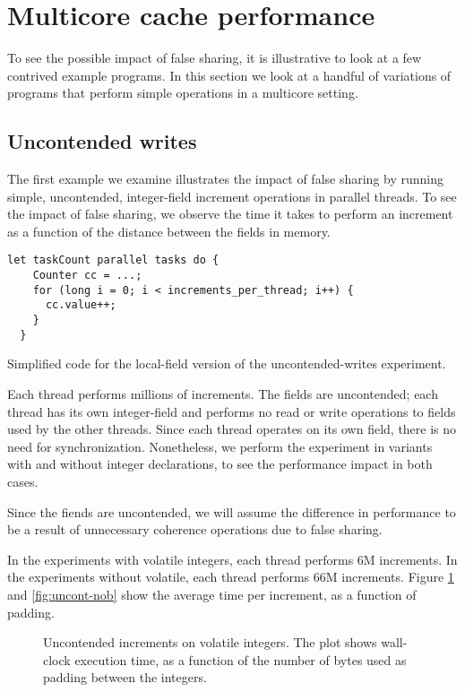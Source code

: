\section{Multicore cache performance}

To see the possible impact of false sharing, it is illustrative to look at a
few contrived example programs. In this section we look at a handful of
variations of programs that perform simple operations in a multicore
setting.

\subsection{Uncontended writes}
The first example we examine illustrates the impact of false sharing by running
simple, uncontended, integer-field increment operations in parallel threads. To see
the impact of false sharing, we observe the time it takes to perform an
increment as a function of the distance between the fields in memory.

\begin{code}
\begin{Verbatim}[frame=single]
  let taskCount parallel tasks do {
    Counter cc = ...;
    for (long i = 0; i < increments_per_thread; i++) {
      cc.value++;
    }
  }
\end{Verbatim}
	\caption{Simplified code for the local-field version of the uncontended-writes
	experiment.}
\end{code}

Each thread performs millions of increments. The fields are
uncontended; each thread has its own integer-field and performs no read or write
operations to fields used by the other threads. Since each thread operates on
its own field, there is no need for synchronization. Nonetheless, we perform
the experiment in variants with and without  integer declarations, to
see the performance impact in both cases.

Since the fiends are uncontended, we will assume the difference in performance
to be a result of unnecessary coherence operations due to false sharing.

In the experiments with volatile integers, each thread performs 6M increments.
In the experiments without volatile, each thread performs 66M increments. 
Figure \ref{fig:uncont} and \ref{fig:uncont-nob} show the average time per
increment, as a function of padding.

\begin{figure}[hbpt]
\graphicspath{{plots/}}

\caption{Uncontended increments on volatile integers. The plot shows wall-clock
	execution time, as a function of the number of bytes used as padding
	between the integers.}
	\label{fig:uncont}
\end{figure}

